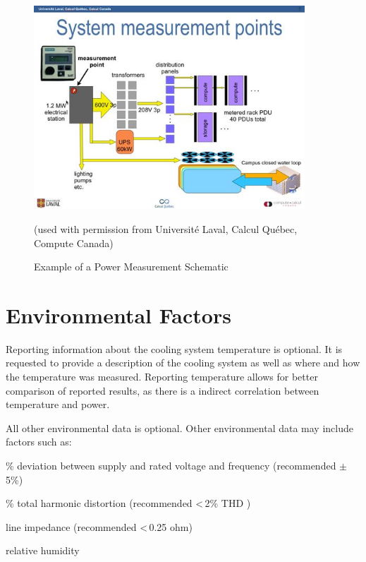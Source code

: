 \begin{figure}
\centering
\includegraphics[width=4in]{fig3-7}
\caption{Example of a Power Measurement Schematic}
(used with permission from Universit\'{e} Laval, Calcul Qu\'{e}bec, Compute Canada)
\label{fig:powmeasschem}
\end{figure}


\section{Environmental Factors}
\label{sec:EF}
\noindent
Reporting information about the cooling system temperature is optional.
It is requested to provide a description of the cooling system as well as where and how the temperature was measured.
Reporting temperature allows for better comparison of reported results, as there is a indirect correlation between temperature and power.

\wl

\noindent
All other environmental data is optional.
Other environmental data may include factors such as:

\begin{packed_item}
\item[{-}]
\% deviation between supply and rated voltage and frequency (recommended $\pm$\,5\%)
\item[{-}]
\% total harmonic distortion (recommended \textless\,2\% THD )
\item[{-}]
line impedance (recommended \textless\,0.25 ohm)
\item[{-}]
relative humidity
\end{packed_item}

